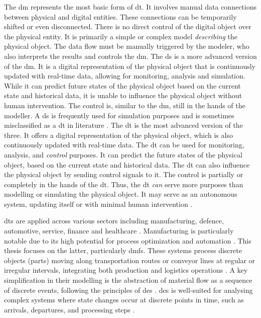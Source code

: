The \gls{dm} represents the most basic form of \gls{dt}. It involves manual data connections between physical and digital entities. These connections can be temporarily shifted or even disconnected. There is no direct control of the digital object over the physical entity. It is primarily a simple or complex model \textit{describing} the physical object. The data flow must be manually triggered by the modeler, who also interprets the results and controls the \gls{dm}.
The \gls{ds} is a more advanced version of the \gls{dm}. It is a digital representation of the physical object that is continuously updated with real-time data, allowing for monitoring, analysis and simulation. While it can predict future states of the physical object based on the current state and historical data, it is unable to influence the physical object without human intervention. The control is, similar to the \gls{dm}, still in the hands of the modeller. A \gls{ds} is frequently used for simulation purposes and is sometimes misclassified as a \gls{dt} in literature \autocite{kritzinger2018digital,sepasgozar2021differentiating}.
The \gls{dt} is the most advanced version of the three. It offers a digital representation of the physical object, which is also continuously updated with real-time data. The \gls{dt} can be used for monitoring, analysis, and \textit{control} purposes. It can predict the future states of the physical object, based on the current state and historical data. The \gls{dt} can also influence the physical object by sending control signals to it. The control is partially or completely in the hands of the \gls{dt}. Thus, the \gls{dt} \textit{can} serve more purposes than modelling or simulating the physical object. It may serve as an autonomous system, updating itself or with minimal human intervention \autocite{kritzinger2018digital}.

\gls{dt}s are applied across various sectors including manufacturing, defence, automotive, service, finance and healthcare \autocite{Tao2018ijamt}. Manufacturing is particularly notable due to its high potential for process optimization and automation \autocite{Tao2018ijamt}. This thesis focuses on the latter, particularly \gls{dmfs}. These systems process discrete objects (parts) moving along transportation routes or conveyor lines at regular or irregular intervals, integrating both production and logistics operations \autocite{arnold2005materialfluss, Schwede2024}. A key simplification in their modelling is the abstraction of material flow as a sequence of discrete events, following the principles of \gls{des} \autocite{kovacs2016mathematical, robinson2014simulation}. \gls{des} is well-suited for analysing complex systems where state changes occur at discrete points in time, such as arrivals, departures, and processing steps \autocite{robinson2014simulation}.

